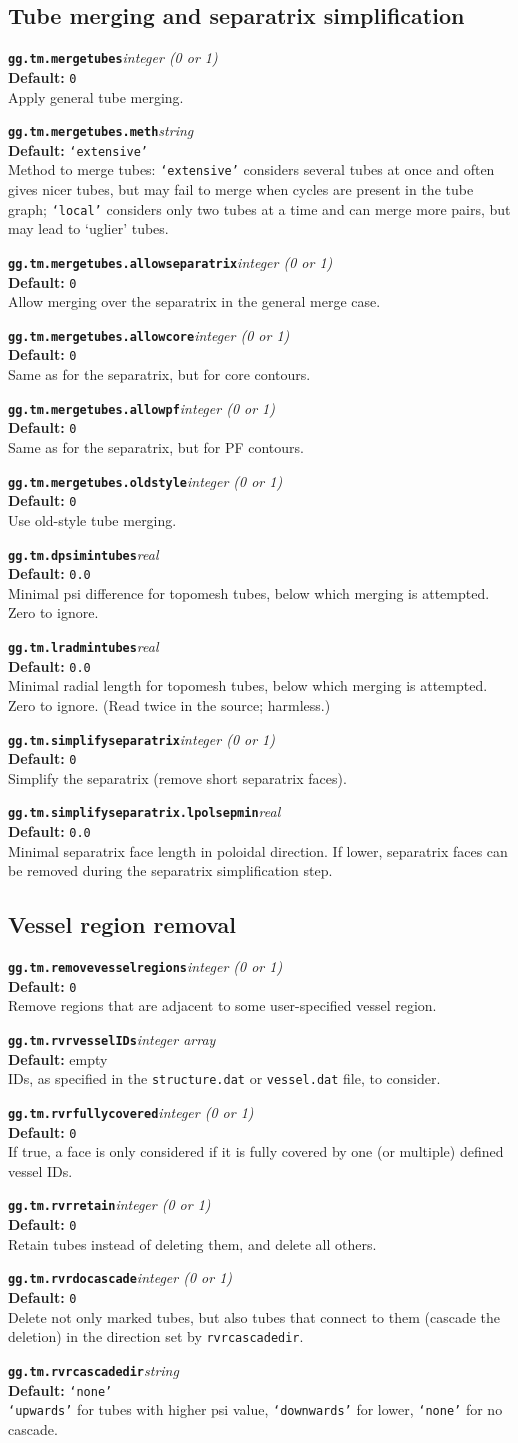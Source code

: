 \documentclass[10pt,a4paper]{article}
\newcommand{\sw}[4]{%
  \par\vspace{0.7em}%
  \begin{minipage}{\linewidth}\raggedright
    \textbf{\texttt{#1}}\hfill\textit{#2}\\[0.1em]
    \textbf{Default:} #3\\[0.1em]
    #4\par
    \vspace{0.3em}{\color{swgrey}\hrule}
  \end{minipage}\par}
\begin{document}
\subsection*{Tube merging and separatrix simplification}
\sw{gg.tm.mergetubes}{integer (0 or 1)}{\texttt{0}}{Apply general tube merging.}
\sw{gg.tm.mergetubes.meth}{string}{\texttt{`extensive'}}{Method to merge tubes: \texttt{`extensive'} considers several tubes at once and often gives nicer tubes, but may fail to merge when cycles are present in the tube graph; \texttt{`local'} considers only two tubes at a time and can merge more pairs, but may lead to `uglier' tubes.}
\sw{gg.tm.mergetubes.allowseparatrix}{integer (0 or 1)}{\texttt{0}}{Allow merging over the separatrix in the general merge case.}
\sw{gg.tm.mergetubes.allowcore}{integer (0 or 1)}{\texttt{0}}{Same as for the separatrix, but for core contours.}
\sw{gg.tm.mergetubes.allowpf}{integer (0 or 1)}{\texttt{0}}{Same as for the separatrix, but for PF contours.}
\sw{gg.tm.mergetubes.oldstyle}{integer (0 or 1)}{\texttt{0}}{Use old-style tube merging.}
\sw{gg.tm.dpsimintubes}{real}{\texttt{0.0}}{Minimal psi difference for topomesh tubes, below which merging is attempted. Zero to ignore.}
\sw{gg.tm.lradmintubes}{real}{\texttt{0.0}}{Minimal radial length for topomesh tubes, below which merging is attempted. Zero to ignore. (Read twice in the source; harmless.)}
\sw{gg.tm.simplifyseparatrix}{integer (0 or 1)}{\texttt{0}}{Simplify the separatrix (remove short separatrix faces).}
\sw{gg.tm.simplifyseparatrix.lpolsepmin}{real}{\texttt{0.0}}{Minimal separatrix face length in poloidal direction. If lower, separatrix faces can be removed during the separatrix simplification step.}

\subsection*{Vessel region removal}
\sw{gg.tm.removevesselregions}{integer (0 or 1)}{\texttt{0}}{Remove regions that are adjacent to some user-specified vessel region.}
\sw{gg.tm.rvrvesselIDs}{integer array}{empty}{IDs, as specified in the \texttt{structure.dat} or \texttt{vessel.dat} file, to consider.}
\sw{gg.tm.rvrfullycovered}{integer (0 or 1)}{\texttt{0}}{If true, a face is only considered if it is fully covered by one (or multiple) defined vessel IDs.}
\sw{gg.tm.rvrretain}{integer (0 or 1)}{\texttt{0}}{Retain tubes instead of deleting them, and delete all others.}
\sw{gg.tm.rvrdocascade}{integer (0 or 1)}{\texttt{0}}{Delete not only marked tubes, but also tubes that connect to them (cascade the deletion) in the direction set by \texttt{rvrcascadedir}.}
\sw{gg.tm.rvrcascadedir}{string}{\texttt{`none'}}{\texttt{`upwards'} for tubes with higher psi value, \texttt{`downwards'} for lower, \texttt{`none'} for no cascade.}
\end{document}
